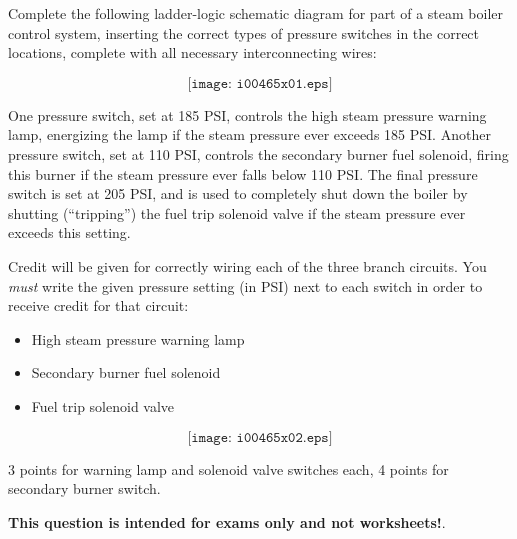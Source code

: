 

Complete the following ladder-logic schematic diagram for part of a steam boiler control system, inserting the correct types of pressure switches in the correct locations, complete with all necessary interconnecting wires:

$$\texttt{[image: i00465x01.eps]}$$

One pressure switch, set at 185 PSI, controls the high steam pressure warning lamp, energizing the lamp if the steam pressure ever exceeds 185 PSI.  Another pressure switch, set at 110 PSI, controls the secondary burner fuel solenoid, firing this burner if the steam pressure ever falls below 110 PSI.  The final pressure switch is set at 205 PSI, and is used to completely shut down the boiler by shutting (``tripping'') the fuel trip solenoid valve if the steam pressure ever exceeds this setting.

\vskip 10pt

\noindent
Credit will be given for correctly wiring each of the three branch circuits.  You {\it must} write the given pressure setting (in PSI) next to each switch in order to receive credit for that circuit:

\begin{itemize}
\item{} High steam pressure warning lamp
\item{} Secondary burner fuel solenoid
\item{} Fuel trip solenoid valve
\end{itemize}







$$\texttt{[image: i00465x02.eps]}$$

3 points for warning lamp and solenoid valve switches each, 4 points for secondary burner switch.







{\bf This question is intended for exams only and not worksheets!}.



